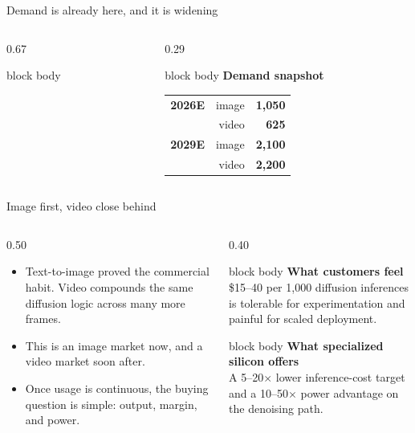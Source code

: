 \documentclass[aspectratio=169,11pt]{beamer}
\newcommand{\money}[1]{\$#1}
\newcommand{\softpanel}[2]{%
\begin{beamercolorbox}[wd=\linewidth,sep=0.8em,rounded=true]{block body}
{\bfseries #1}\\[0.25em]
{\small #2}
\end{beamercolorbox}
}
\begin{document}
\begin{frame}{Demand is already here, and it is widening}
\begin{columns}[T,totalwidth=\textwidth]
\begin{column}{0.67\textwidth}
\begin{beamercolorbox}[wd=\linewidth,sep=0.75em,rounded=true]{block body}
\begin{center}
      \end{center}
    \end{beamercolorbox}
  \end{column}
  \begin{column}{0.29\textwidth}
    \begin{beamercolorbox}[wd=\linewidth,sep=0.65em,rounded=true]{block body}
      {\bfseries Demand snapshot}\\[0.25em]
      {\scriptsize
      \begin{tabular}{@{}l r r@{}}
      \textbf{2026E} & image & \textbf{1,050} \\
                    & video & \textbf{625} \\
      \textbf{2029E} & image & \textbf{2,100} \\
                    & video & \textbf{2,200}
      \end{tabular}}
    \end{beamercolorbox}
  \end{column}
\end{columns}
\end{frame}

\begin{frame}{Image first, video close behind}
\begin{columns}[T,totalwidth=\textwidth]
  \begin{column}{0.50\textwidth}
    \small\raggedright
    \begin{itemize}
      \item Text-to-image proved the commercial habit. Video compounds the same diffusion logic across many more frames.
      \item This is an image market now, and a video market soon after.
      \item Once usage is continuous, the buying question is simple: output, margin, and power.
    \end{itemize}
  \end{column}
  \begin{column}{0.40\textwidth}
    \softpanel{What customers feel}{\money{15--40} per 1{,}000 diffusion inferences is tolerable for experimentation and painful for scaled deployment.}

    \vspace{0.25em}

    \softpanel{What specialized silicon offers}{A 5--20$\times$ lower inference-cost target and a 10--50$\times$ power advantage on the denoising path.}
  \end{column}
\end{columns}
\end{frame}
\end{document}

